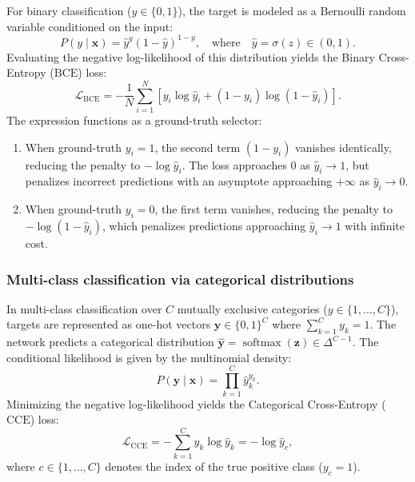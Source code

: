 \documentclass[../../main.tex]{subfiles}
\begin{document}
For binary classification ($y \in \{0, 1\}$), the target is modeled as a Bernoulli random variable conditioned on the input:
\begin{equation}
P(y \mid \mathbf{x}) = \hat{y}^y \left( 1 - \hat{y} \right)^{1 - y}, \quad \text{where} \quad \hat{y} = \sigma(z) \in (0, 1).
\end{equation}
Evaluating the negative log-likelihood of this distribution yields the Binary Cross-Entropy ($\text{BCE}$) loss:
\begin{equation}
\mathcal{L}_{\text{BCE}} = -\frac{1}{N} \sum_{i=1}^N \left[ y_i \log \hat{y}_i + (1 - y_i) \log(1 - \hat{y}_i) \right].
\end{equation}
The expression functions as a ground-truth selector:
\begin{enumerate}[label=(\roman*)]
    \item When ground-truth $y_i = 1$, the second term $(1 - y_i)$ vanishes identically, reducing the penalty to $-\log \hat{y}_i$. The loss approaches $0$ as $\hat{y}_i \to 1$, but penalizes incorrect predictions with an asymptote approaching $+\infty$ as $\hat{y}_i \to 0$.
    \item When ground-truth $y_i = 0$, the first term vanishes, reducing the penalty to $-\log(1 - \hat{y}_i)$, which penalizes predictions approaching $\hat{y}_i \to 1$ with infinite cost.
\end{enumerate}

\subsubsection{Multi-class classification via categorical distributions}

In multi-class classification over $C$ mutually exclusive categories ($y \in \{1, \dots, C\}$), targets are represented as one-hot vectors $\mathbf{y} \in \{0, 1\}^C$ where $\sum_{k=1}^C y_k = 1$. The network predicts a categorical distribution $\hat{\mathbf{y}} = \operatorname{softmax}(\mathbf{z}) \in \Delta^{C-1}$. The conditional likelihood is given by the multinomial density:
\begin{equation}
P(\mathbf{y} \mid \mathbf{x}) = \prod_{k=1}^C \hat{y}_k^{y_k}.
\end{equation}
Minimizing the negative log-likelihood yields the Categorical Cross-Entropy ($\text{CCE}$) loss:
\begin{equation}
\mathcal{L}_{\text{CCE}} = -\sum_{k=1}^C y_k \log \hat{y}_k = -\log \hat{y}_c,
\end{equation}
where $c \in \{1, \dots, C\}$ denotes the index of the true positive class ($y_c = 1$).
\end{document}
